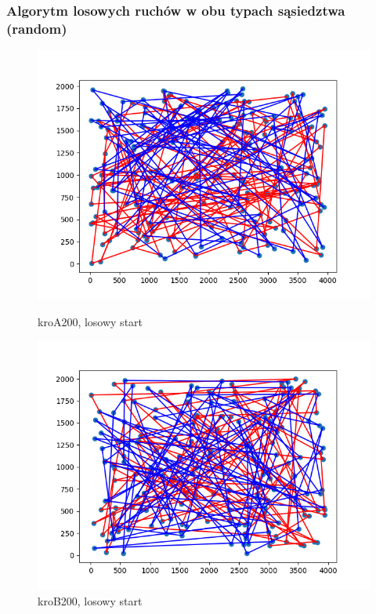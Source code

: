 \documentclass[11pt]{article}
\begin{document}
\subsubsection{Algorytm losowych ruchów w obu typach sąsiedztwa (random)}
\begin{figure}[H]
    \centering
    \begin{minipage}[t]{0.45\textwidth}
        \centering
        \includegraphics[width=\linewidth]{best_paths/kroA200/traverse_random/randomstart.png}
        \caption{kroA200, losowy start}
    \end{minipage}
    \hfill
    \begin{minipage}[t]{0.45\textwidth}
        \centering
        \includegraphics[width=\linewidth]{best_paths/kroB200/traverse_random/randomstart.png}
        \caption{kroB200, losowy start}
    \end{minipage}


\end{figure}
\end{document}

